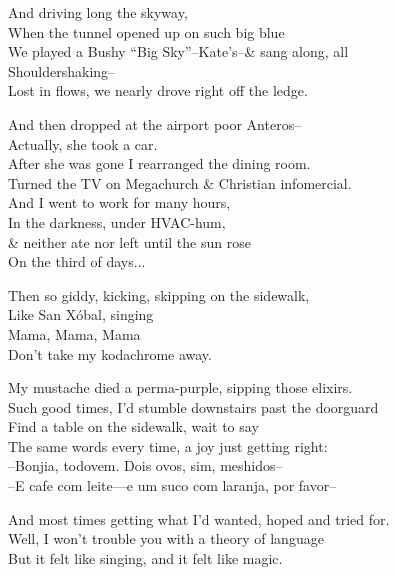 

And driving long the skyway, \\
When the tunnel opened up on such big blue \\
We played a Bushy ``Big Sky''--Kate's--\& sang along, all \\
Shouldershaking-- \\
Lost in flows, we nearly drove right off the ledge. 

And then dropped at the airport poor Anteros-- \\
Actually, she took a car. \\
After she was gone I rearranged the dining room. \\
Turned the TV on Megachurch \& Christian infomercial. \\
And I went to work for many hours, \\
In the darkness, under HVAC-hum, \\
\& neither ate nor left until the sun rose \\
On the third of days...

Then so giddy, kicking, skipping on the sidewalk, \\
Like San Xóbal, singing \\
\qquad Mama, Mama, Mama \\
\qquad Don't take my kodachrome away.

My mustache died a perma-purple, sipping those elixirs. \\
Such good times, I'd stumble downstairs past the doorguard \\
Find a table on the sidewalk, wait to say \\
The same words every time, a joy just getting right: \\
--Bonjia, todovem. Dois ovos, sim, meshidos-- \\
--E cafe com leite—e um suco com laranja, por favor--

And most times getting what I'd wanted, hoped and tried for. \\
Well, I won't trouble you with a theory of language \\
But it felt like singing, and it felt like magic. 


